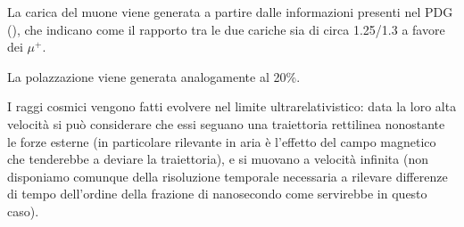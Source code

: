 La carica del muone viene generata a partire dalle informazioni presenti nel PDG (\cite{bib:Patrignani:2016xqp}), che indicano come il rapporto tra le due cariche sia di circa 1.25/1.3 a favore dei $\mu^+$.

La polazzazione viene generata analogamente al 20\%.

I raggi cosmici vengono fatti evolvere nel limite ultrarelativistico: data la loro alta velocità si può considerare che essi seguano una traiettoria rettilinea nonostante
le forze esterne (in particolare rilevante in aria è l'effetto del campo magnetico che tenderebbe a deviare la traiettoria), e si muovano a velocità infinita (non disponiamo comunque della risoluzione temporale necessaria a rilevare differenze di tempo dell'ordine della frazione di nanosecondo come servirebbe in questo caso).
